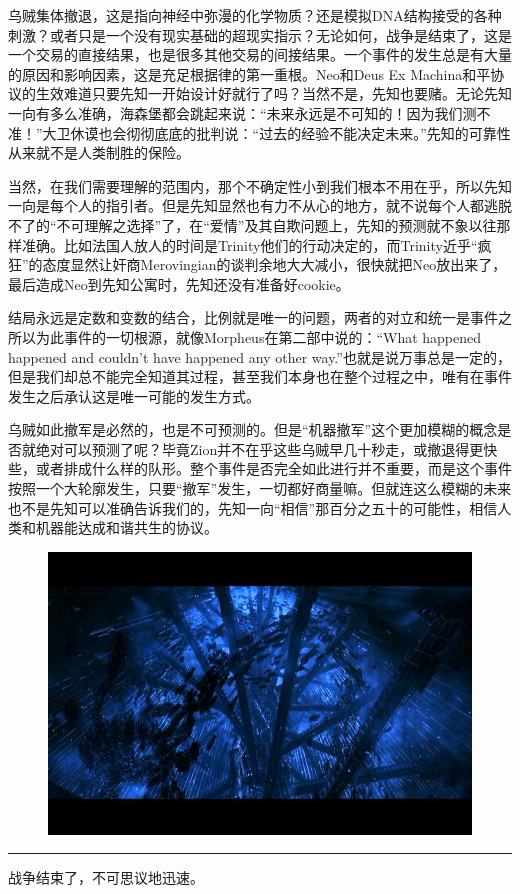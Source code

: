 \documentclass[UTF8]{ctexart}
\newcommand{\myparsep}{\noindent \rule[0.5ex]{\linewidth}{1pt}}
\begin{document}
乌贼集体撤退，这是指向神经中弥漫的化学物质？还是模拟DNA结构接受的各种刺激？或者只是一个没有现实基础的超现实指示？无论如何，战争是结束了，这是一个交易的直接结果，也是很多其他交易的间接结果。一个事件的发生总是有大量的原因和影响因素，这是充足根据律的第一重根。Neo和Deus Ex Machina和平协议的生效难道只要先知一开始设计好就行了吗？当然不是，先知也要赌。无论先知一向有多么准确，海森堡都会跳起来说：“未来永远是不可知的！因为我们测不准！”大卫休谟也会彻彻底底的批判说：“过去的经验不能决定未来。”先知的可靠性从来就不是人类制胜的保险。

当然，在我们需要理解的范围内，那个不确定性小到我们根本不用在乎，所以先知一向是每个人的指引者。但是先知显然也有力不从心的地方，就不说每个人都逃脱不了的“不可理解之选择”了，在“爱情”及其自欺问题上，先知的预测就不象以往那样准确。比如法国人放人的时间是Trinity他们的行动决定的，而Trinity近乎“疯狂”的态度显然让奸商Merovingian的谈判余地大大减小，很快就把Neo放出来了，最后造成Neo到先知公寓时，先知还没有准备好cookie。

结局永远是定数和变数的结合，比例就是唯一的问题，两者的对立和统一是事件之所以为此事件的一切根源，就像Morpheus在第二部中说的：“What happened happened and couldn't have happened any other way.”也就是说万事总是一定的，但是我们却总不能完全知道其过程，甚至我们本身也在整个过程之中，唯有在事件发生之后承认这是唯一可能的发生方式。

乌贼如此撤军是必然的，也是不可预测的。但是“机器撤军”这个更加模糊的概念是否就绝对可以预测了呢？毕竟Zion并不在乎这些乌贼早几十秒走，或撤退得更快些，或者排成什么样的队形。整个事件是否完全如此进行并不重要，而是这个事件按照一个大轮廓发生，只要“撤军”发生，一切都好商量嘛。但就连这么模糊的未来也不是先知可以准确告诉我们的，先知一向“相信”那百分之五十的可能性，相信人类和机器能达成和谐共生的协议。

\begin{figure}[htb]
\centering
\includegraphics[width=0.5\linewidth]{fig/39cd2fddf21be7dd8c10295a.jpg}
\end{figure}

\myparsep

战争结束了，不可思议地迅速。
\end{document}
